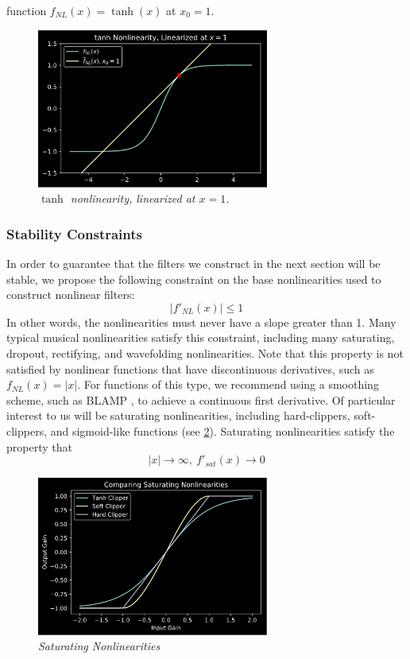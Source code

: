\documentclass[twoside,a4paper]{article}
\begin{document}
function $f_{NL}(x) = \tanh(x)$ at $x_0=1$.
%
\begin{figure}[h]
    \center
    \includegraphics[width=3in]{../Pics/tanh_linized.png}
    \caption{\label{tanh_lin}{\it $\tanh$ nonlinearity, linearized at $x=1$.}}
\end{figure}
%
\subsubsection{Stability Constraints}

In order to guarantee that the filters we construct in the next section
will be stable, we propose the following constraint on the base
nonlinearities used to construct nonlinear filters:
%
\begin{equation}
    \left| f'_{NL}(x) \right| \leq 1
    \label{eq:NL_constraint}
\end{equation}
%
In other words, the nonlinearities must never have
a slope greater than 1. Many typical musical nonlinearities satisfy
this constraint, including many saturating, dropout, rectifying,
and wavefolding nonlinearities. Note that this property is not satisfied by
nonlinear functions that have discontinuous derivatives, such as
$f_{NL}(x) = |x|$. For functions of this type, we recommend using a
smoothing scheme, such as BLAMP \cite{BLAMP}, to achieve a continuous
first derivative.
\newline\newline
Of particular interest to us will be saturating
nonlinearities, including hard-clippers, soft-clippers, and sigmoid-like
functions (see \cref{Sats}).
Saturating nonlinearities satisfy the property that
%
\begin{equation}
    |x| \rightarrow \infty, \ f'_{sat}(x) \rightarrow 0
    \label{eq:Sat_constraint}
\end{equation}
%
\begin{figure}[h]
    \center
    \includegraphics[width=3in]{../Pics/Sat-NLs.png}
    \caption{\label{Sats}{\it Saturating Nonlinearities}}
\end{figure}
%
\end{document}
